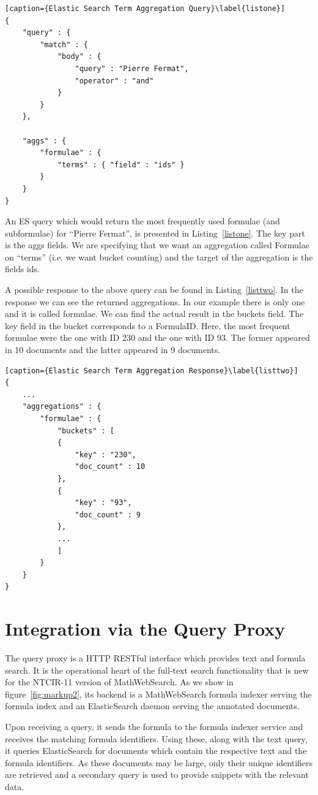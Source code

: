 \documentclass{deliverablereport}
\def\MWS{\textsf{MathWebSearch}\xspace}
\begin{document}
\begin{lstlisting}[caption={Elastic Search Term Aggregation Query}\label{listone}]
{
	"query" : {
		"match" : {
			"body" : {
				"query" : "Pierre Fermat",
				"operator" : "and"
			}
		}
	},

	"aggs" : {
		"formulae" : {
			"terms" : { "field" : "ids" }
		}
	}
}

\end{lstlisting}

An ES query which would return the most frequently used formulae (and subformulae) for
“Pierre Fermat”, is presented in Listing~\ref{listone}. The key part is the aggs fields. We are
specifying that we want an aggregation called Formulae on “terms” (i.e. we want bucket
counting) and the target of the aggregation is the fields ids. 

A possible response to the above query can be found in Listing~\ref{listtwo}. In the response we can
see the returned aggregations. In our example there is only one and it is called
formulae. We can find the actual result in the buckets field. The key field in the bucket
corresponds to a FormulaID. Here, the most frequent formulae were the one with ID 230 and
the one with ID 93. The former appeared in 10 documents and the latter appeared in 9
documents.

\begin{lstlisting}[caption={Elastic Search Term Aggregation Response}\label{listtwo}]
{
	...
	"aggregations" : {
		"formulae" : {
			"buckets" : [
			{
				"key" : "230",
				"doc_count" : 10
			},
			{
				"key" : "93",
				"doc_count" : 9
			},
			...
			]
		}
	}
}
\end{lstlisting}

\section{Integration via the Query Proxy}\label{sec:proxy}

The query proxy is a HTTP RESTful interface which provides text and formula search. It is the operational heart of the full-text search functionality that is new for the NTCIR-11 version of \MWS. As we show in figure~\ref{fig:markup2}, its backend is a \MWS formula indexer serving the formula index and an ElasticSearch daemon serving the annotated documents. 

Upon receiving a query, it sends the formula to the formula indexer service and receives the matching formula identifiers. Using these, along with the text query, it queries ElasticSearch for documents which contain the respective text and the formula identifiers. As these documents may be large, only their unique identifiers are retrieved and a secondary query is used to provide snippets with the relevant data. 
\end{document}
